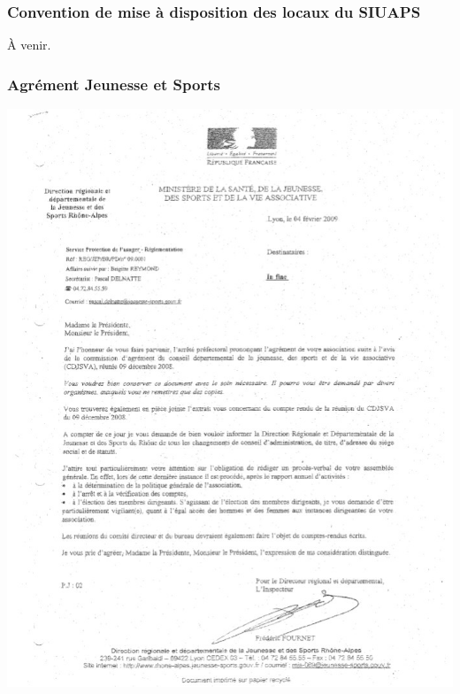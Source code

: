 \documentclass[hidelinks, paper=a4, fontsize=13pt]{report}
\begin{document}
\subsubsection{Convention de mise à disposition des locaux du SIUAPS}
À venir.


\subsubsection{Agrément Jeunesse et Sports}



\begin{center}
\includegraphics[scale=0.85]{Annexes/Documents/AgrementJeunesseEtSports}
\end{center}
\end{document}
